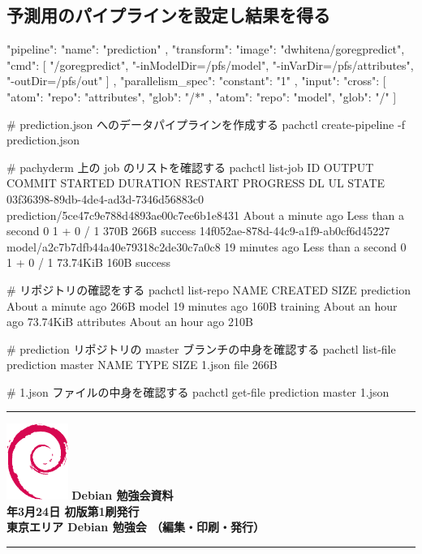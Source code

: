 \documentclass[mingoth,a4paper]{jsarticle}
\newcommand{\debmtgyear}{2018}
\newcommand{\debmtgmonth}{3}
\newcommand{\debmtgdate}{24}
\begin{document}
\subsection{予測用のパイプラインを設定し結果を得る}

\begin{commandline}
{
  "pipeline": {
    "name": "prediction"
  },
  "transform": {
    "image": "dwhitena/goregpredict",
    "cmd": [
      "/goregpredict",
      "-inModelDir=/pfs/model",
      "-inVarDir=/pfs/attributes",
      "-outDir=/pfs/out"
    ]
  },
  "parallelism_spec": {
    "constant": "1"
  },
  "input": {
    "cross": [
    {
      "atom": {
        "repo": "attributes",
        "glob": "/*"
      }
    },
      {
        "atom": {
          "repo": "model",
          "glob": "/"
        }
      }
    ]
  }
}
\end{commandline}

\begin{commandline}
# prediction.json へのデータパイプラインを作成する
pachctl create-pipeline -f prediction.json

# pachyderm 上の job のリストを確認する
pachctl list-job
ID OUTPUT COMMIT STARTED DURATION RESTART PROGRESS DL UL STATE
03f36398-89db-4de4-ad3d-7346d56883c0
prediction/5ce47c9e788d4893ae00c7ee6b1e8431 About a minute ago Less than a
second 0 1 + 0 / 1 370B 266B success
14f052ae-878d-44c9-a1f9-ab0cf6d45227 model/a2c7b7dfb44a40e79318c2de30c7a0c8
19 minutes ago Less than a second 0 1 + 0 / 1 73.74KiB 160B success

# リポジトリの確認をする
pachctl list-repo
NAME CREATED SIZE
prediction About a minute ago 266B
model 19 minutes ago 160B
training About an hour ago 73.74KiB
attributes About an hour ago 210B

# prediction リポジトリの master ブランチの中身を確認する
pachctl list-file prediction master
NAME TYPE SIZE
1.json file 266B

# 1.json ファイルの中身を確認する
pachctl get-file prediction master 1.json
\end{commandline}

%
\mbox{}\newpage


\vspace*{15cm}
\hrule
\vspace{2mm}
\includegraphics[width=2cm]{image200502/openlogo-nd.eps}
\noindent \Large \bf Debian 勉強会資料\\
\noindent \normalfont \debmtgyear{}年\debmtgmonth{}月\debmtgdate{}日 \hspace{5mm}  初版第1刷発行\\
\noindent \normalfont 東京エリア Debian 勉強会 （編集・印刷・発行）\\
\hrule
\end{document}
